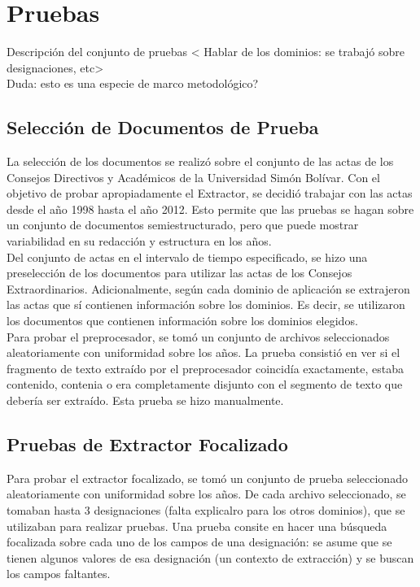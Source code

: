 \chapter{Pruebas} \label{chap:pruebas}

Descripción del conjunto de pruebas < Hablar de los dominios: se trabajó sobre designaciones, etc>\\

Duda: esto es una especie de marco metodológico?\\

\section{Selección de Documentos de Prueba}

La selección de los documentos se realizó sobre el conjunto de las actas de los Consejos Directivos y Académicos de la Universidad Simón Bolívar. Con el objetivo de probar apropiadamente el Extractor, se decidió trabajar con las actas desde el año 1998 hasta el año 2012. Esto permite que las pruebas se hagan sobre un conjunto de documentos semiestructurado, pero que puede mostrar variabilidad en su redacción y estructura en los años.\\

Del conjunto de actas en el intervalo de tiempo especificado, se hizo una preselección de los documentos para utilizar las actas de los Consejos Extraordinarios. Adicionalmente, según cada dominio de aplicación se extrajeron las actas que sí contienen información sobre los dominios. Es decir, se utilizaron los documentos que contienen información sobre los dominios elegidos.\\

Para probar el preprocesador, se tomó un conjunto de archivos seleccionados aleatoriamente con uniformidad sobre los años. La prueba consistió en ver si el fragmento de texto extraído por el preprocesador coincidía exactamente, estaba contenido, contenia o era completamente disjunto con el segmento de texto que debería ser extraído. Esta prueba se hizo manualmente. \\

\section{Pruebas de Extractor Focalizado}

Para probar el extractor focalizado, se tomó un conjunto de prueba seleccionado aleatoriamente con uniformidad sobre los años. De cada archivo seleccionado, se tomaban hasta 3 designaciones (falta explicalro para los otros dominios), que se utilizaban para realizar pruebas. Una prueba consite en hacer una búsqueda focalizada sobre cada uno de los campos de una designación: se asume que se tienen algunos valores de esa designación (un contexto de extracción) y se buscan los campos faltantes. \\

